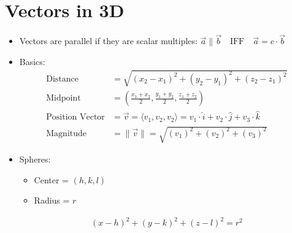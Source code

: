 \documentclass{article}
\begin{document}
\section{Vectors in 3D}
\begin{itemize}
  \item Vectors are parallel if they are scalar multiples: \(\vec{a}\parallel\vec{b} \quad\textrm{IFF}\quad \vec{a} = c\cdot\vec{b}\)
  \item Basics:
  \begin{align}
    \textrm{Distance} &= \sqrt{(x_2 - x_1)^2 + (y_2 - y_1)^2 + (z_2 - z_1)^2} \\
    \textrm{Midpoint} &= \left( \frac{x_1 + x_2}{2}, \frac{y_1 + y_2}{2}, \frac{z_1 + z_2}{2} \right) \\
  \textrm{Position Vector} &= \vec{v} = \langle v_1, v_2, v_2 \rangle = v_1\cdot\hat{i} + v_2\cdot\hat{j} + v_3\cdot\hat{k} \\
  \textrm{Magnitude} &= \|\vec{v}\| = \sqrt{(v_1)^2 + (v_2)^2 + (v_3)^2}
  \end{align}
  \item Spheres:
  \begin{itemize}
    \item Center = $(h, k, l)$
    \item Radius = $r$
  \end{itemize}
  \begin{align}
    (x - h)^2 + (y - k)^2 + (z - l)^2 = r^2
  \end{align}
\end{itemize}
\end{document}

